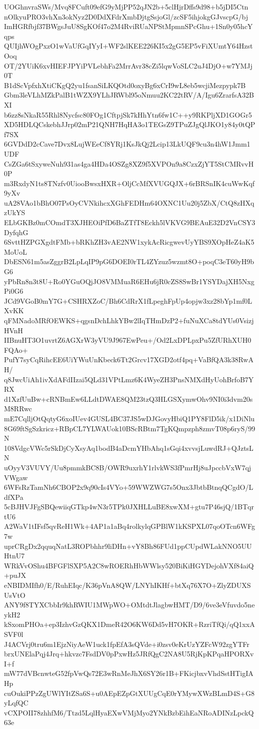 UOGhnvraSWs/Mvq8FCuft09efG9yMjPP52qJN2b+5clHjrDffs9d98+b5jDI5Ctn
nOlkyuPRO3vhXn3okNyz2D0DdXFdrXmbDjtgSsjoGl/zcSF5ihjokgGJvscpG/bj
ImHGRfbjf37BWgsJuU8SgKOf47o2M4RviRUaNPStMpmnSPcGhu+1Sn0y05hcYqps
QUIjhWOgPxzO1wVaUfGqIYyI+WF2slKEE226KI5x2gG5EP5vFiXUmtY64HzstOoq
OT/2YUiK6xvHIEFJPYiPVLebhFa2MrrAvr38cZi5lqwVoSLC2uJ4DjO+w7YMJj0T
B1dScVpfxhXtiCKgQ2yu1fsanSiLKQOtd0oxyBg6xCrI9wL8eb5wcjiMezpypk7B
Gbm3leVLhMZkPalB1tWZX9YLhJRWbl95oNmuu2KC22tRV/A/Igu6ZrarfsA32BXI
b6zz8sNkaR55Rhl8Nycfsc80FOg1CftpjSk7kHhYtn6fw1C++y9RKPljXD1GOGr5
XD5HDLQCskebhJJrp02mP21QNH7HqHA3o1TEGsZ9TPuZJgQlJKO1y84y0tQPf7SX
6GVDdD2cCave7Dvx8LujWEeCf8YRj1KsJkQj2Lcip13LkUQF9cu3n4hW1Jmm1UDF
CsZGa6tSxyweNuh931as4ga4HDa4OSZg8XZ9f5XVPOn9a8CzxZjYT5StCMRvvH0P
m3RxdyN1ts8TNzfv0UiooBwsxHXR+OljCcMfXVUGQJX+6rBRSnIK4cuWwKqf9yXv
uA28VAo1bBhO07PsOyCVNkihcxXGhFEDHm64OXNC1Uu20j5ZbX/CtQ8zHXqzUkYS
ELbGKBz0mCOmdT3XJHEOiPfD6BaZTfT8Eckh5lVKVG9BEAuE32D2VnCSY3DyfqhG
6SvttHZPGXgdtFMb+bRKhZH3vAE2NW1xykAcRicgwevUyYBS9XOpHeZ4aK5MoUoL
DbESN61m5asZggrB2LpLqIP9pG6DOEI0rTL4ZYzuz5wzmt8O+poqC3eT60yH9bG6
yPbRn8n3t8U+Ro0YGuOQjJO8VMMuaR6EHu6jR0cZS8SwBr1YSYDajXH5NxgPi0G6
JCd9VGoB0mY7G+CSHRXZoC/Bh6CdRrX1fLpeghFpUp4opjw3xz28bYp1mf0LXvKK
qFMNadoMRfOEWKS+qgsnDchLhkYBw2lIqTHmDzP2+fuNuXCa8tdYUs0VsizjHVnH
IIBnuHT3O1uvrtZ6AGXrW3yVU9J967EwPeu+/Od2LxDPLpxPu5ZfURhXUH0FQAo+
PufY7syCqRihcEE6UiYWuUnKbeck6Tt2Grcv17XGD2otf4pq+VaBfQA3k38RwAH/
q8JwcUiAh1ivXdAFdIIzai5QLd31VPtLmz6K4WyeZH3PnsNMXdHyUohBrfoB7YRX
d1XzfUuBw+cRNBmEw6LLdtDWAE8QM23tzQ3HLGSXymwOhv9NI0i3dvm20sM8RRwc
mE7CqlljOtQqtyG6xoIUev4GUSL4BC37JS5wDJGovyHbiQ1PY8FlD5ik/x1DiNlu
8G69ftSgSzkricz+RBpCL7YLWAUok10BScRBtm7TgKQmpzph8zmvT08p6ryS/99N
108VdgcVWc5rSkDjCyXsyAq1bodB4aDcmYHbAhq1sGqi4xvvsjLuwdRJ+QJztsLN
uOyyV3VUVY/Uu8pmmkBC8B/OWR9uxrhY1rlvkWS3fPmrHj8uJpccbVxW7qjVWgaw
6WFsRzTamNh6CBOP2x9q90cIs4VYo+59WWZWG7s5Onx3JbtbBtnqQCgdO/LdfXPa
5cBJHVJFgSBQewiiqGTkp4wN3r5TPk0JXHLLuBE8xwXM+gtu7P46sjQ/1BTqrtU6
A2WaV1tIFsf5qvReH1Wk+4AP1a1aBq4rolkylqGPBlW1kKSPXL07qoOTcn6WFg7w
uprCRgDx2qquqNatL3ROPbhhr9liDHn+vY8Bh86FUd1ppCUpdWLakNNO5UUHtnU7
WRkVvOShu4BFGFlSXP5A2C8wROERhHbWWlsy520BiKiHGYDejohVXf84aiQ+puJX
eNBIDMIfh0/E/RuhEIqc/K36pVnA8QW/LNYhIKHf+btXq76X7O+ZlyZDUXSUsVtO
ANY9f8TYXCbbIr9khRWIU1MWpWO+OMtdtJlagbwHMT/D9/6ve3eVfuvdo5neykH2
kSxomPHOa+ep3IzhvGzQKX1DmeR42O6KW6Dd5vH7OKR+RzriTfQi/qQ1xxASVF0l
J4ACVrj0tru6m1EjzNiyAeW1uck1fpEfA3sQVde+i0zsv0eKrUzYZFcW92zgYTFr
brxUNElaPqj4Jrq+hkvzc7FsdDV0pPxwHz5JRfQgC2NA8U5RjKpKPqaHPORXvI+f
mW77dVBcnwteG52fpVwQs72E3wRnMeJhX6SY26r1B+FKicjbxvVhdSstHTigIAHp
cuOukiPPzZgUWlYItZSa6S+u0AEpEZpGtXUUgCqE0rYMywXWzBLmD4S+G8yLqfQC
vCXPOII78zhhfM6/Ttzd5LqlHyaEXwVMjMyo2YNkBzbEihEaNRoADINzLpckQ63e

